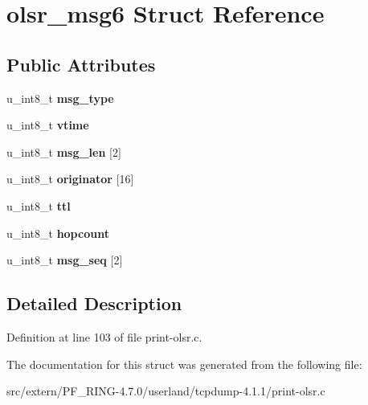 \hypertarget{structolsr__msg6}{
\section{olsr\_\-msg6 Struct Reference}
\label{structolsr__msg6}
}
\subsection*{Public Attributes}
\begin{DoxyCompactItemize}
\item 
\hypertarget{structolsr__msg6_a1ee63850926a7670e18c330ffd98812f}{
u\_\-int8\_\-t {\bfseries msg\_\-type}}
\label{structolsr__msg6_a1ee63850926a7670e18c330ffd98812f}

\item 
\hypertarget{structolsr__msg6_aceebf85d4e67a87c3409d4fb773d8783}{
u\_\-int8\_\-t {\bfseries vtime}}
\label{structolsr__msg6_aceebf85d4e67a87c3409d4fb773d8783}

\item 
\hypertarget{structolsr__msg6_a5bbb3fb486c5080901c152dbdb6753bd}{
u\_\-int8\_\-t {\bfseries msg\_\-len} \mbox{[}2\mbox{]}}
\label{structolsr__msg6_a5bbb3fb486c5080901c152dbdb6753bd}

\item 
\hypertarget{structolsr__msg6_ae606cea9d2ffcc398ab7ad10962ca97a}{
u\_\-int8\_\-t {\bfseries originator} \mbox{[}16\mbox{]}}
\label{structolsr__msg6_ae606cea9d2ffcc398ab7ad10962ca97a}

\item 
\hypertarget{structolsr__msg6_a631f92b269509a4af60a3ba4065a4533}{
u\_\-int8\_\-t {\bfseries ttl}}
\label{structolsr__msg6_a631f92b269509a4af60a3ba4065a4533}

\item 
\hypertarget{structolsr__msg6_a2861634933bcea9965bd3746093df4f5}{
u\_\-int8\_\-t {\bfseries hopcount}}
\label{structolsr__msg6_a2861634933bcea9965bd3746093df4f5}

\item 
\hypertarget{structolsr__msg6_affb750af6b0d42d87ba8cff8f2a9ed2c}{
u\_\-int8\_\-t {\bfseries msg\_\-seq} \mbox{[}2\mbox{]}}
\label{structolsr__msg6_affb750af6b0d42d87ba8cff8f2a9ed2c}

\end{DoxyCompactItemize}


\subsection{Detailed Description}


Definition at line 103 of file print-\/olsr.c.



The documentation for this struct was generated from the following file:\begin{DoxyCompactItemize}
\item 
src/extern/PF\_\-RING-\/4.7.0/userland/tcpdump-\/4.1.1/print-\/olsr.c\end{DoxyCompactItemize}
